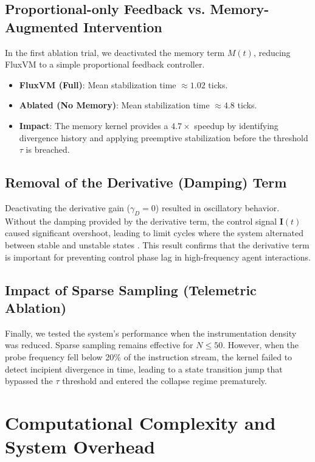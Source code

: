 \documentclass{article}
\begin{document}
\subsection{Proportional-only Feedback vs. Memory-Augmented Intervention}
In the first ablation trial, we deactivated the memory term $M(t)$, reducing FluxVM to a simple proportional feedback controller.
\begin{itemize}
    \item \textbf{FluxVM (Full)}: Mean stabilization time $\approx 1.02$ ticks.
    \item \textbf{Ablated (No Memory)}: Mean stabilization time $\approx 4.8$ ticks.
    \item \textbf{Impact}: The memory kernel provides a $4.7\times$ speedup by identifying divergence history and applying preemptive stabilization before the threshold $\tau$ is breached.
\end{itemize}

\subsection{Removal of the Derivative (Damping) Term}
Deactivating the derivative gain ($\gamma_D = 0$) resulted in oscillatory behavior. Without the damping provided by the derivative term, the control signal $\mathbf{I}(t)$ caused significant overshoot, leading to limit cycles where the system alternated between stable and unstable states \cite{astrom2010feedback}. This result confirms that the derivative term is important for preventing control phase lag in high-frequency agent interactions.

\subsection{Impact of Sparse Sampling (Telemetric Ablation)}
Finally, we tested the system's performance when the instrumentation density was reduced. Sparse sampling remains effective for $N \le 50$. However, when the probe frequency fell below 20\% of the instruction stream, the kernel failed to detect incipient divergence in time, leading to a state transition jump that bypassed the $\tau$ threshold and entered the collapse regime prematurely.

\newpage

\section{Computational Complexity and System Overhead}
\label{sec:complexity_analysis}
\end{document}
